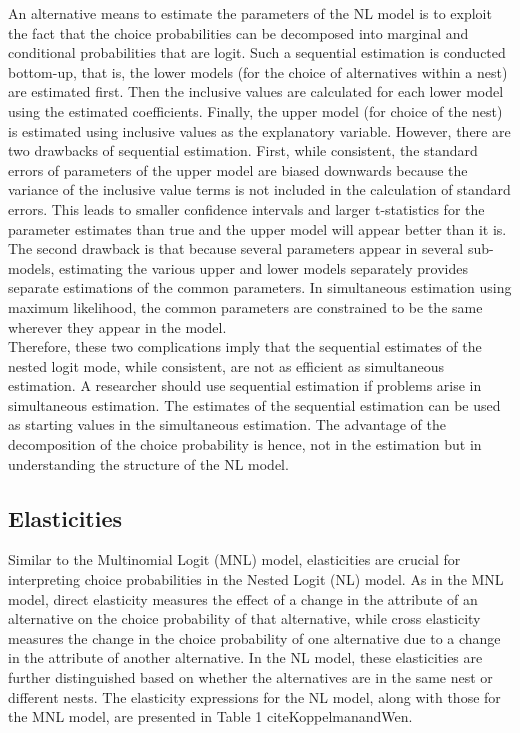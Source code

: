 \documentclass[a4paper,11pt]{article}
\begin{document}
    An alternative means to estimate the parameters of the NL model is to exploit the fact that the choice probabilities can be decomposed into marginal and conditional probabilities that are logit. Such a sequential estimation is conducted bottom-up, that is, the lower models (for the choice of alternatives within a nest) are estimated first. Then the inclusive values are calculated for each lower model using the estimated coefficients. Finally, the upper model (for choice of the nest) is estimated using inclusive values as the explanatory variable. However, there are two drawbacks of sequential estimation. First, while consistent, the standard errors of parameters of the upper model are biased downwards because the variance of the inclusive value terms is not included in the calculation of standard errors. This leads to smaller confidence intervals and larger t-statistics for the parameter estimates than true and the upper model will appear better than it is. The second drawback is that because several parameters appear in several sub-models, estimating the various upper and lower models separately provides separate estimations of the common parameters. In simultaneous estimation using maximum likelihood, the common parameters are constrained to be the same wherever they appear in the model. \\

    Therefore, these two complications imply that the sequential estimates of the nested logit mode, while consistent, are not as efficient as simultaneous estimation. A researcher should use sequential estimation if problems arise in simultaneous estimation. The estimates of the sequential estimation can be used as starting values in the simultaneous estimation. The advantage of the decomposition of the choice probability is hence, not in the estimation but in understanding the structure of the NL model.

\subsection{Elasticities}
\label{subsection:Elasticities}

    Similar to the Multinomial Logit (MNL) model, elasticities are crucial for interpreting choice probabilities in the Nested Logit (NL) model. As in the MNL model, direct elasticity measures the effect of a change in the attribute of an alternative on the choice probability of that alternative, while cross elasticity measures the change in the choice probability of one alternative due to a change in the attribute of another alternative. In the NL model, these elasticities are further distinguished based on whether the alternatives are in the same nest or different nests. The elasticity expressions for the NL model, along with those for the MNL model, are presented in Table 1 cite{KoppelmanandWen}.\\
\end{document}
